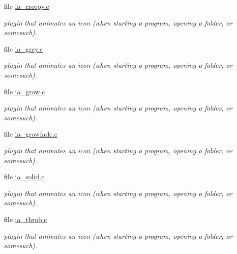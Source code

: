 \begin{CompactItemize}
\item 
file \hyperlink{ia__creepy_8c}{ia\_\-creepy.c}
\begin{CompactList}\small\item\em plugin that animates an icon (when starting a program, opening a folder, or somesuch). \item\end{CompactList}

\item 
file \hyperlink{ia__grey_8c}{ia\_\-grey.c}
\begin{CompactList}\small\item\em plugin that animates an icon (when starting a program, opening a folder, or somesuch). \item\end{CompactList}

\item 
file \hyperlink{ia__grow_8c}{ia\_\-grow.c}
\begin{CompactList}\small\item\em plugin that animates an icon (when starting a program, opening a folder, or somesuch). \item\end{CompactList}

\item 
file \hyperlink{ia__growfade_8c}{ia\_\-growfade.c}
\begin{CompactList}\small\item\em plugin that animates an icon (when starting a program, opening a folder, or somesuch). \item\end{CompactList}

\item 
file \hyperlink{ia__solid_8c}{ia\_\-solid.c}
\begin{CompactList}\small\item\em plugin that animates an icon (when starting a program, opening a folder, or somesuch). \item\end{CompactList}

\item 
file \hyperlink{ia__throb_8c}{ia\_\-throb.c}
\begin{CompactList}\small\item\em plugin that animates an icon (when starting a program, opening a folder, or somesuch). \item\end{CompactList}


\end{CompactItemize}
